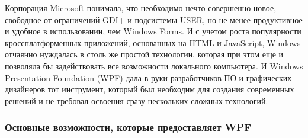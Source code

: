 \documentclass[a4paper,14pt]{extarticle}
\begin{document}
Корпорация Microsoft понимала, что необходимо нечто совершенно новое, свободное от
ограничений GDI+ и подсистемы USER, но не менее продуктивное и удобное в использовании,
чем Windows Forms. И с учетом роста популярности кроссплатформенных приложений, основанных
на HTML и JavaScript, Windows отчаянно нуждалась в столь же простой технологии, которая
при этом еще и позволяла бы задействовать все возможности локального компьютера. И Windows
Presentation Foundation (WPF) дала в руки разработчиков ПО и графических дизайнеров тот
инструмент, который был необходим для создания современных решений и не требовал освоения
сразу нескольких сложных технологий.

\subsubsection*{Основные возможности, которые предоставляет WPF}
\end{document}
